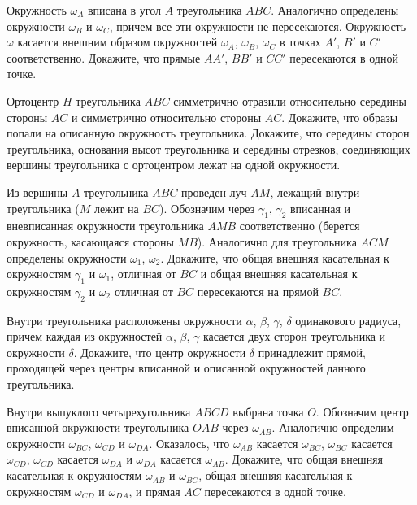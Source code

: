 \item
Окружность $\omega_A$ вписана в угол $A$ треугольника $ABC$. Аналогично определены окружности $\omega_B$ и $\omega_C$, причем все эти окружности не пересекаются. Окружность $\omega$ касается внешним образом окружностей $\omega_A$, $\omega_B$, $\omega_C$ в точках $A'$, $B'$ и $C'$ соответственно.
Докажите, что прямые $AA'$, $BB'$ и $CC'$ пересекаются в одной точке.

\item
\sp Ортоцентр $H$ треугольника $ABC$ симметрично отразили относительно середины стороны $AC$ и симметрично относительно стороны $AC$.
Докажите, что образы попали на описанную окружность треугольника.
 Докажите, что середины сторон треугольника, основания высот треугольника и середины отрезков, соединяющих вершины треугольника с ортоцентром лежат на одной окружности.

\item
Из вершины $A$ треугольника $ABC$ проведен луч $AM$, лежащий внутри треугольника ($M$ лежит на $BC$). Обозначим через $\gamma_1$, $\gamma_2$ вписанная и вневписанная окружности треугольника $AMB$ соответственно (берется окружность, касающаяся стороны $MB$). Аналогично для треугольника $ACM$ определены окружности $\omega_1$, $\omega_2$.
Докажите, что общая внешняя касательная к окружностям $\gamma_1$ и $\omega_1$, отличная от $BC$ и общая внешняя касательная к окружностям $\gamma_2$ и $\omega_2$ отличная от $BC$ пересекаются на прямой $BC$.

\item
Внутри треугольника расположены окружности $\alpha $, $\beta $, $\gamma $, $\delta $ одинакового радиуса, причем каждая из окружностей $\alpha $, $\beta $, $\gamma $ касается двух сторон треугольника и окружности $\delta $.
Докажите, что центр окружности $\delta $ принадлежит прямой, проходящей через центры вписанной и описанной окружностей данного треугольника.

\item
Внутри выпуклого четырехугольника $ABCD$ выбрана точка $O$. Обозначим центр вписанной окружности треугольника $OAB$ через $\omega_{AB}$. Аналогично определим окружности $\omega_{BC}$, $\omega_{CD}$ и $\omega_{DA}$. Оказалось, что $\omega_{AB}$ касается $\omega_{BC}$, $\omega_{BC}$ касается $\omega_{CD}$, $\omega_{CD}$ касается $\omega_{DA}$ и $\omega_{DA}$ касается $\omega_{AB}$.
Докажите, что общая внешняя касательная к окружностям $\omega_{AB}$ и $\omega_{BC}$, общая внешняя касательная к окружностям $\omega_{CD}$ и $\omega_{DA}$, и прямая $AC$ пересекаются в одной точке. \\


